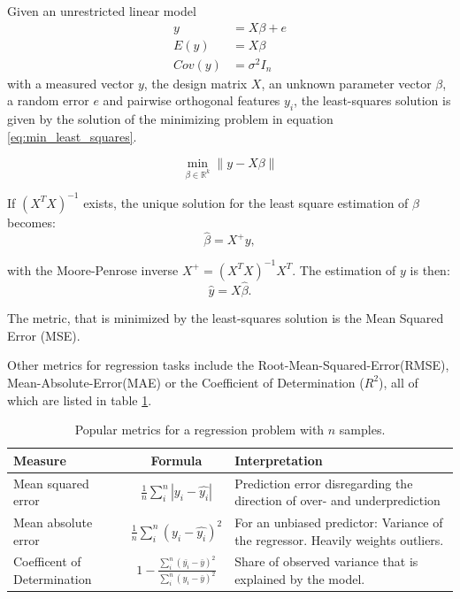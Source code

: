 Given an unrestricted linear model
\begin{align}
	y &= X\beta + e \\
	E(y) &= X\beta \\
	Cov(y) &= \sigma^2 I_n
\end{align}
with a measured vector $y$, the design matrix $X$,
an unknown parameter vector $\beta$, a random error $e$
and pairwise orthogonal features $y_i$,
the least-squares solution is given by the solution of
the minimizing problem in equation \ref{eq:min_least_squares}.

\begin{equation}
	\min_{\beta\in\mathbb{R}^k} \lVert y - X\beta \rVert
	\label{eq:min_least_squares}
\end{equation}

If $(X^TX)^{-1}$ exists, the unique solution for the
least square estimation of $\beta$ becomes:
\begin{equation}
	\hat{\beta} = X^+ y,
\end{equation}

with the Moore-Penrose inverse $X^+ = (X^TX)^{-1}X^T$.
The estimation of $y$ is then:
\begin{equation}
  \hat{y} = X\hat{\beta}.
\end{equation}

The metric, that is minimized by the least-squares solution
is the Mean Squared Error (MSE).

Other metrics for regression tasks include the
Root-Mean-Squared-Error(RMSE),
Mean-Absolute-Error(MAE)
or the Coefficient of Determination ($R^2$), all of which are listed in table
\ref{tab:regr_metrics}.

\begin{table}
  \caption{Popular metrics for a regression problem with $n$ samples.}
  \begin{center}
    \begin{tabularx}{\textwidth}{l c X}
      Measure & Formula & Interpretation \\
      \hline
      Mean squared error & $\frac{1}{n}\sum_i^n |y_i-\hat{y_i}|$ & Prediction error disregarding the direction of over- and underprediction \\
      Mean absolute error & $\frac{1}{n}\sum_i^n (y_i-\hat{y_i})^2$ & For an unbiased predictor: Variance of the regressor. Heavily weights outliers. \\
      Coefficent of Determination & $1 - \frac{\sum_i^n (\bar{y_i}-\bar{y})^2}{\sum_i^n (y_i-\bar{y})^2}$ & Share of observed variance that is explained by the model.\\
    \end{tabularx}
  \end{center}
  \label{tab:regr_metrics}
\end{table}

